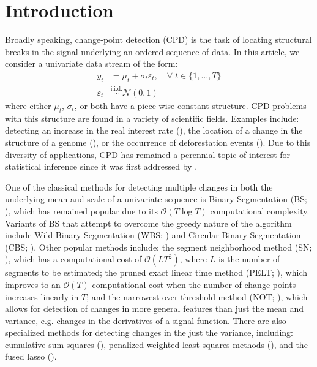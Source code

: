 \section{Introduction}
\label{sec:intro}

Broadly speaking, change-point detection (CPD) is the task of locating structural breaks in the signal underlying an ordered sequence of data. In this article, we consider a univariate data stream of the form:
\begin{align}
    y_t &= \mu_t + \sigma_t \varepsilon_t, \quad\forall\; t\in\{1,\ldots,T\} \\
    \varepsilon_t &\overset{\text{i.i.d.}}{\sim} \mathcal{N}(0,1)
\end{align}
where either $\mu_t$, $\sigma_t$, or both have a piece-wise constant structure. CPD problems with this structure are found in a variety of scientific fields. Examples include: detecting an increase in the real interest rate (\citealp{Bai03}), the location of a change in the structure of a genome (\citealp{Muggeo11}), or the occurrence of deforestation events (\citealp{Wendelberger21}). Due to this diversity of applications, CPD has remained a perennial topic of interest for statistical inference since it was first addressed by \cite{Page54}.

One of the classical methods for detecting multiple changes in both the underlying mean and scale of a univariate sequence is Binary Segmentation (BS; \citealp{Scott74, Sen75, Vostrikova81}), which has remained popular due to its $\mathcal{O}(T\log T)$ computational complexity. Variants of BS that attempt to overcome the greedy nature of the algorithm include Wild Binary Segmentation (WBS; \citealp{Fryzlewicz14}) and Circular Binary Segmentation (CBS; \citealp{Olshen04}). Other popular methods include: the segment neighborhood method (SN; \citealp{Auger89}), which has a computational cost of $\mathcal{O}(LT^2)$, where $L$ is the number of segments to be estimated; the pruned exact linear time method (PELT; \citealp{Killick12}), which improves to an $\mathcal{O}(T)$ computational cost when the number of change-points increases linearly in $T$; and the narrowest-over-threshold method (NOT; \citealp{Baranowski19}), which allows for detection of changes in more general features than just the mean and variance, e.g. changes in the derivatives of a signal function. There are also specialized methods for detecting changes in the just the variance, including: cumulative sum squares (\citealp{Inclan94}), penalized weighted least squares methods (\citealp{Chen97, Gao19}), and the fused lasso (\citealp{Padilla22}). 

